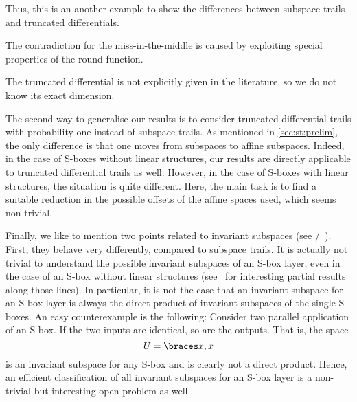 \begin{table}
\begin{sidecaption}
\begin{threeparttable}
\begin{tablenotes}
             Thus, this is an another example to show the differences between subspace trails and truncated differentials.
    \item[\dag] %
                The contradiction for the miss-in-the-middle is caused by exploiting special properties of the round function.
    \item[\ddag] The truncated differential is not explicitly given in the literature, so we do not know its exact dimension.
    \end{tablenotes}
    \end{threeparttable}
    \end{sidecaption}
\end{table}

The second way to generalise our results is to consider truncated differential trails with probability one instead of subspace trails.
As mentioned in \cref{sec:st:prelim}, the only difference is that one moves from subspaces to affine subspaces.
Indeed, in the case of S-boxes without linear structures, our results are directly applicable to truncated differential trails as well.
However, in the case of S-boxes with linear structures, the situation is quite different.
Here, the main task is to find a suitable reduction in the possible offsets of the affine spaces used, which seems non-trivial.

Finally, we like to mention two points related to invariant subspaces (see \eg/~\cite{EC:LeaMinRon15}).
First, they behave very differently, compared to subspace trails.
It is actually not trivial to understand the possible invariant subspaces of an S-box layer, even in the case of an S-box without linear structures (see~\cite{EPRINT:LiuRij17} for interesting partial results along those lines).
In particular, it is not the case that an invariant subspace for an S-box layer is always the direct product of invariant subspaces of the single S-boxes.
An easy counterexample is the following: Consider two parallel application of an S-box.
If the two inputs are identical, so are the outputs.
That is, the space
\begin{equation*}
    U=\set{x,x}
\end{equation*}
is an invariant subspace for any S-box and is clearly not a direct product.
Hence, an efficient classification of all invariant subspaces for an S-box layer is a non-trivial but interesting open problem as well.

